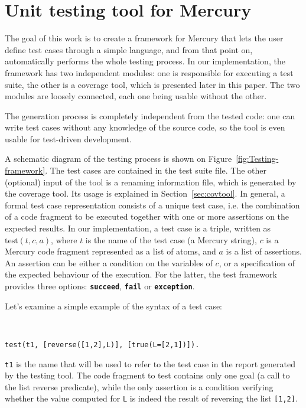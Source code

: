 \documentclass[british]{llncs}
\begin{document}
\section{Unit testing tool for Mercury}\label{unittest}

The goal of this work is to create a
framework for Mercury that lets the user define test cases through
a simple language, and from that point on, automatically performs the whole testing process. In our implementation, the framework has two independent
modules: one is responsible for executing a test suite, the other
is a coverage tool, which is presented later in this paper. The two
modules are loosely connected, each one being usable without the other.

The generation process is completely independent
from the tested code: one can write test cases without any knowledge
of the source code, so the tool is even usable for test-driven development.


A schematic diagram of the testing process is shown on Figure~\ref{fig:Testing-framework}.
The test cases are contained in the test suite file. 
The other (optional) input of the tool is a renaming information file, which is generated
by the coverage tool. Its usage is explained in Section~\ref{sec:covtool}.
In general, a formal test case representation consists of a unique
test case, i.e. the combination of a code fragment to be executed together with one or more assertions
on the expected results.
In our implementation, a test case is a triple, written as $\mbox{test}(t,c,a)$,
where $t$ is the name of the test case (a Mercury string), $c$ is
a Mercury code fragment represented as a list of atoms, and $a$ is a
list of assertions. An assertion can be either a condition on the
variables of $c$, or a specification of the expected behaviour of
the execution. For the latter, the test framework provides three options: \texttt{\textbf{succeed}},
\texttt{\textbf{fail}} or \texttt{\textbf{exception}}. 


Let's examine a simple example of the syntax of a test case:

\begin{example}\label{ex:testcase}\ \\
\vspace*{-0.5 cm}
\begin{lstlisting}[basicstyle={\ttfamily},breaklines=true,tabsize=4]
test(t1, [reverse([1,2],L)], [true(L=[2,1])]).
\end{lstlisting}


\noindent \texttt{t1} is the name that will be used to refer to the
test case in the report generated by the testing tool. The code fragment
to test contains only one goal (a call to the list reverse predicate),
while the only assertion is a condition verifying whether the value
computed for \texttt{L} is indeed the result of reversing the list
\texttt{{[}1,2{]}}. 
\end{example}
\end{document}
